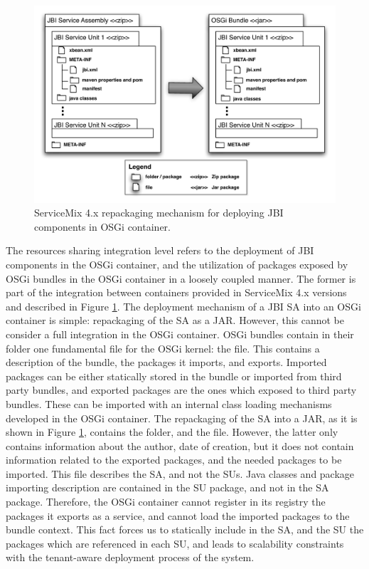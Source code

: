 \begin{figure}[htb]
	\centering
		\includegraphics[clip, scale=0.5]{./gfx/osgibundlepackage.pdf}
	\caption[JBI to OSGi repackaging]{ServiceMix 4.x repackaging mechanism for deploying \ac{JBI} components in \ac{OSGi} container.}
	\label{fig:jbitoosgipackage}
\end{figure}

The resources sharing integration level refers to the deployment of \ac{JBI} components in the \ac{OSGi} container, and the utilization of packages exposed by \ac{OSGi} bundles in the \ac{OSGi} container in a loosely coupled manner. The former is part of the integration between containers provided in ServiceMix 4.x versions and described in Figure \ref{fig:jbitoosgipackage}. The deployment mechanism of a \ac{JBI} \ac{SA} into an \ac{OSGi} container is simple: repackaging of the \ac{SA} as a JAR. However, this cannot be consider a full integration in the \ac{OSGi} container. \ac{OSGi} bundles contain in their  folder one fundamental file for the \ac{OSGi} kernel: the  file. This contains a description of the bundle, the packages it imports, and exports. Imported packages can be either statically stored in the bundle or imported from third party bundles, and exported packages are the ones which exposed to third party bundles. These can be imported with an internal class loading mechanisms developed in the \ac{OSGi} container. The repackaging of the \ac{SA} into a JAR, as it is shown in Figure \ref{fig:jbitoosgipackage}, contains the  folder, and the  file. However, the latter only contains information about the author, date of creation, but it does not contain information related to the exported packages, and the needed packages to be imported. This  file describes the \ac{SA}, and not the \ac{SU}s. Java classes and package importing description are contained in the \ac{SU} package, and not in the \ac{SA} package. Therefore, the \ac{OSGi} container cannot register in its registry the packages it exports as a service, and cannot load the imported packages to the bundle context. This fact forces us to statically include in the \ac{SA}, and the \ac{SU} the packages which are referenced in each \ac{SU}, and leads to scalability constraints with the tenant-aware deployment process of the system.

